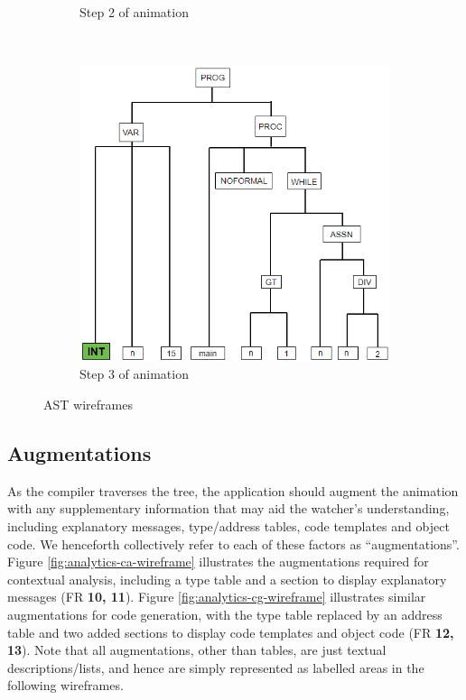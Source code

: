 \documentclass{l4proj}
\begin{document}
\begin{figure}[h]
\begin{subfigure}[b]{0.3\textwidth}
		\caption{Step 2 of animation}
		\label{fig:anim-step-2}
	\end{subfigure}	
	~
	\begin{subfigure}[b]{0.3\textwidth}
		\includegraphics[width=\linewidth]{images/animation-active-wireframe3.png}
		\caption{Step 3 of animation}
		\label{fig:anim-step-3}
	\end{subfigure}	
	\caption{AST wireframes}
	\label{fig:animation-active-wireframe}	
\end{figure}

\subsection{Augmentations}
As the compiler traverses the tree, the application should augment the animation with any supplementary information that may aid the watcher's understanding, including explanatory messages, type/address tables, code templates and object code. We henceforth collectively refer to each of these factors as ``augmentations''. Figure \ref{fig:analytics-ca-wireframe} illustrates the augmentations required for contextual analysis, including a type table and a section to display explanatory messages (FR \textbf{10, 11}). Figure \ref{fig:analytics-cg-wireframe} illustrates similar augmentations for code generation, with the type table replaced by an address table and two added sections to display code templates and object code (FR \textbf{12, 13}). Note that all augmentations, other than tables, are just textual descriptions/lists, and hence are simply represented as labelled areas in the following wireframes.
\end{document}
